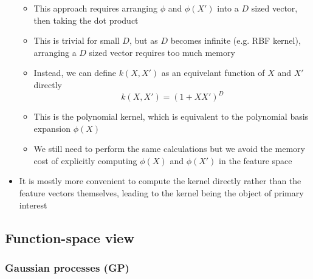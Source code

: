 \documentclass[12pt]{article}
\begin{document}
\begin{itemize}
\begin{itemize}
\begin{equation}
\end{equation}
        \item This approach requires arranging $\phi$ and $\phi(X')$ into a $D$ sized vector, then taking the dot product
        \item This is trivial for small $D$, but as $D$ becomes infinite (e.g. RBF kernel), arranging a $D$ sized vector requires too much memory
        \item Instead, we can define $k(X,X')$ as an equivelant function of $X$ and $X'$ directly
\begin{equation}
    k(X,X') = (1 + XX')^D
\end{equation}
        \item This is the polynomial kernel, which is equivalent to the polynomial basis expansion $\phi(X)$
        \item We still need to perform the same calculations but we avoid the memory cost of explicitly computing $\phi(X)$ and $\phi(X')$ in the feature space
    \end{itemize}
    \item It is mostly more convenient to compute the kernel directly rather than the feature vectors themselves, leading to the kernel being the object of primary interest
\end{itemize}



\subsection{Function-space view}


\subsubsection{Gaussian processes (GP)}
\end{document}
